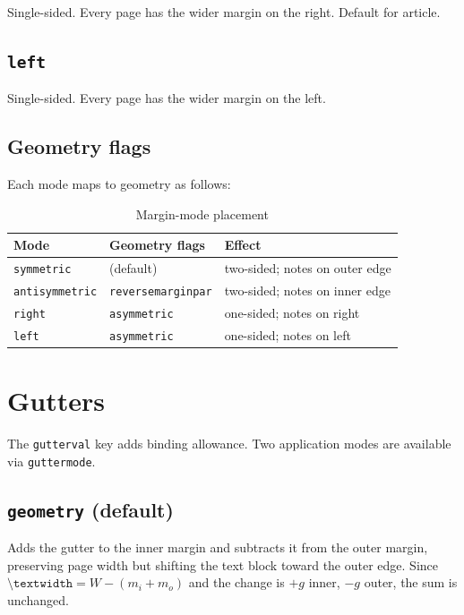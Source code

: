 \documentclass[11pt, twoside, openany]{book}
\newcommand{\pkg}[1]{\textsf{#1}}
\newcommand{\cmd}[1]{\texttt{\textbackslash #1}}
\begin{document}
Single-sided. Every page has the wider margin on the right. Default for \pkg{article}.

\section{\texttt{left}}\label{sec:left}

Single-sided. Every page has the wider margin on the left.

\section{Geometry flags}\label{sec:geometryflags}

Each mode maps to \pkg{geometry} as follows:

\begin{table}[h]
	\centering
	\caption{Margin-mode placement}
	\label{tab:marginplacement}
	\begin{tabular}{@{}lll@{}}
		\toprule
		\bfseries Mode         & \bfseries Geometry flags  & \bfseries Effect               \\
		\midrule
		\texttt{symmetric}     & (default)                 & two-sided; notes on outer edge \\
		\texttt{antisymmetric} & \texttt{reversemarginpar} & two-sided; notes on inner edge \\
		\texttt{right}         & \texttt{asymmetric}       & one-sided; notes on right      \\
		\texttt{left}          & \texttt{asymmetric}       & one-sided; notes on left       \\
		\bottomrule
	\end{tabular}
\end{table}


\chapter{Gutters}\label{chapter:gutters}

The \texttt{gutterval} key adds binding allowance. Two application modes are available via \texttt{guttermode}.

\section{\texttt{geometry} (default)}\label{sec:guttergeometry}

Adds the gutter to the inner margin and subtracts it from the outer margin, preserving page width but shifting the text block toward the outer edge. Since $\cmd{textwidth} = W - (m_i + m_o)$ and the change is $+g$ inner, $-g$ outer, the sum is unchanged.
\end{document}
